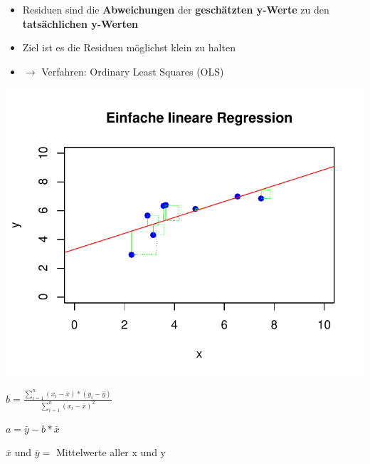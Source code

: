 \documentclass[aspectratio=169, journal, x11names, unknownkeysallowed, hyperref={colorlinks,
linkcolor = SS2,
urlcolor  = F3,
citecolor = F3,
anchorcolor = A4}, 12pt]{beamer}
\newcommand{\oarrow}{\textcolor{A1}{$\rightarrow$} }
\begin{document}
\begin{frame}[t]
  \begin{minipage}[t]{0.45\textwidth}
    \vspace{-11.5em}
    \begin{itemize}
      \item Residuen sind die \textbf{Abweichungen} der \textbf{geschätzten y-Werte} zu den \textbf{tatsächlichen y-Werten} 
      \item Ziel ist es die Residuen möglichst klein zu halten
      \item[] \oarrow Verfahren: Ordinary Least Squares (OLS)
    \end{itemize}
\end{minipage}%
\begin{minipage}[t]{0.45\textwidth}
  \begin{center}
    \includegraphics[scale=0.5]{../Plots/reg_lin_5.pdf}
  \end{center}

  \vspace{-1em}
  \footnotesize
  \hspace{2em} $b = \frac{\sum_{i = 1}^{n}(x_i-\bar{x})*(y_i-\bar{y})}{\sum_{i = 1}^{n}(x_i-\bar{x})^2} $ 

  \medskip
  \hspace{2em} $a = \bar{y} - b * \bar{x}$

  \medskip
  \hspace{2em} $\bar{x}$ und $\bar{y} = $  Mittelwerte aller x und y

  \end{minipage}
\end{frame}
\end{document}
